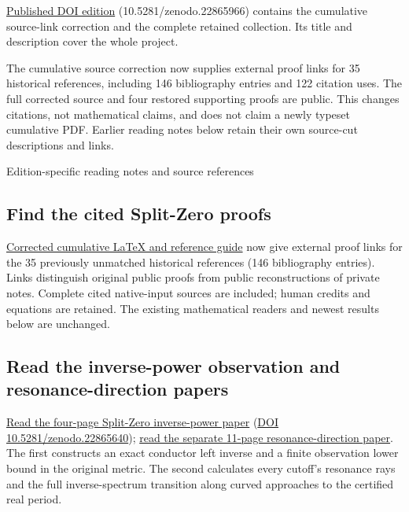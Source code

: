 \documentclass[
]{article}
\begin{document}
\href{https://zenodo.org/records/22865966}{Published DOI edition}
(10.5281/zenodo.22865966) contains the cumulative source-link correction
and the complete retained collection. Its title and description cover
the whole project.

The cumulative source correction now supplies external proof links for
35 historical references, including 146 bibliography entries and 122
citation uses. The full corrected source and four restored supporting
proofs are public. This changes citations, not mathematical claims, and
does not claim a newly typeset cumulative PDF. Earlier reading notes
below retain their own source-cut descriptions and links.

Edition-specific reading notes and source references

\subsection{Find the cited Split-Zero
proofs}\label{find-the-cited-split-zero-proofs}

\href{https://github.com/KokunoYumeto/zeta-function-research-reader/blob/main/workbenches/splitzero-tandem/continuations/20260921-historical-proof-citations/README.md}{Corrected
cumulative LaTeX and reference guide} now give external proof links for
the 35 previously unmatched historical references (146 bibliography
entries). Links distinguish original public proofs from public
reconstructions of private notes. Complete cited native-input sources
are included; human credits and equations are retained. The existing
mathematical readers and newest results below are unchanged.

\subsection{Read the inverse-power observation and resonance-direction
papers}\label{read-the-inverse-power-observation-and-resonance-direction-papers}

\href{https://zenodo.org/records/22865640}{Read the four-page Split-Zero
inverse-power paper} (\href{https://doi.org/10.5281/zenodo.22865640}{DOI
10.5281/zenodo.22865640});
\href{https://zenodo.org/records/22865640/files/105-splitzero-real-period-directions.pdf?download=1}{read
the separate 11-page resonance-direction paper}. The first constructs an
exact conductor left inverse and a finite observation lower bound in the
original metric. The second calculates every cutoff's resonance rays and
the full inverse-spectrum transition along curved approaches to the
certified real period.
\end{document}
